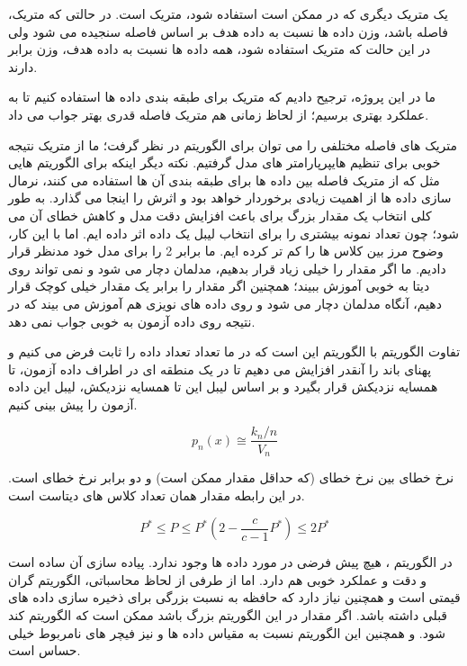 \documentclass[12pt,onecolumn,a4paper]{article}
\begin{document}
یک متریک دیگری که در  ممکن است استفاده شود، متریک  است. در حالتی که متریک، فاصله باشد، وزن داده ها نسبت به داده هدف بر اساس فاصله سنجیده می شود ولی در این حالت که متریک  استفاده شود، همه داده ها نسبت به داده هدف، وزن برابر دارند. 

ما در این پروژه، ترجیح دادیم که متریک  برای طبقه بندی داده ها استفاده کنیم تا به عملکرد بهتری برسیم؛ از لحاظ زمانی هم متریک فاصله قدری بهتر جواب می داد.

متریک های فاصله مختلفی را می توان برای الگوریتم  در نظر گرفت؛ ما از متریک  نتیجه خوبی برای تنظیم هایپرپارامتر های مدل گرفتیم. نکته دیگر اینکه برای الگوریتم هایی مثل  که از متریک فاصله بین داده ها برای طبقه بندی آن ها استفاده می کنند، نرمال سازی داده ها از اهمیت زیادی برخوردار خواهد بود و اثرش را اینجا می گذارد.
به طور کلی انتخاب یک مقدار بزرگ برای  باعث افزایش دقت مدل و کاهش خطای آن می شود؛ چون تعداد نمونه بیشتری را برای انتخاب لیبل یک داده اثر داده ایم. اما با این کار، وضوح مرز بین کلاس ها را کم تر کرده ایم. ما  برابر 2 را برای مدل خود مدنظر قرار دادیم.
ما اگر مقدار  را خیلی زیاد قرار بدهیم، مدلمان دچار  می شود و نمی تواند روی دیتا به خوبی آموزش ببیند؛ همچنین اگر مقدار  را برابر یک مقدار خیلی کوچک قرار دهیم، آنگاه مدلمان دچار  می شود و روی داده های نویزی هم آموزش می بیند که در نتیجه روی داده آزمون به خوبی جواب نمی دهد.

تفاوت الگوریتم  با الگوریتم  این است که در  ما تعداد  تعداد داده را ثابت فرض می کنیم و پهنای باند را آنقدر افزایش می دهیم تا در یک منطقه ای در اطراف داده آزمون،  تا همسایه نزدیکش قرار بگیرد و بر اساس لیبل این  تا همسایه نزدیکش، لیبل این داده آزمون را پیش بینی کنیم.

\begin{equation}
    p_n(x) \cong \frac{k_n/n}{V_n}
\end{equation}

نرخ خطای  بین نرخ خطای  (که حداقل مقدار ممکن است) و دو برابر نرخ خطای  است. در این رابطه مقدار  همان تعداد کلاس های دیتاست است.

\begin{equation}
    P^* \leq P \leq P^*(2-\frac{c}{c-1}P^*) \leq 2P^*
\end{equation}

در الگوریتم ، هیچ پیش فرضی در مورد داده ها وجود ندارد. پیاده سازی آن ساده است و دقت و عملکرد خوبی هم دارد. اما از طرفی از لحاظ محاسباتی، الگوریتم گران قیمتی است و همچنین نیاز دارد که حافظه به نسبت بزرگی برای ذخیره سازی داده های قبلی داشته باشد. اگر مقدار  در این الگوریتم بزرگ باشد ممکن است که الگوریتم کند شود. و همچنین این الگوریتم نسبت به مقیاس داده ها و نیز فیچر های نامربوط خیلی حساس است.
\end{document}
